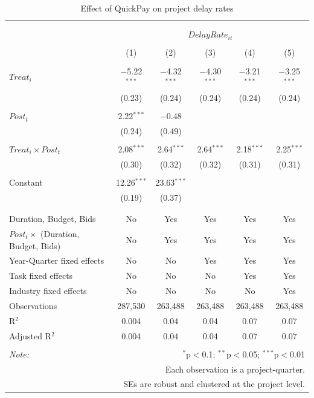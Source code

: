 \documentclass[
]{article}
\begin{document}
\begin{table}[H] \centering 
  \caption{Effect of QuickPay on project delay rates} 
  \label{} 
\small 
\begin{tabular}{@{\extracolsep{-2pt}}lccccc} 
\\[-1.8ex]\hline 
\hline \\[-1.8ex] 
\\[-1.8ex] & \multicolumn{5}{c}{$DelayRate_{it}$} \\ 
\\[-1.8ex] & (1) & (2) & (3) & (4) & (5)\\ 
\hline \\[-1.8ex] 
 $Treat_i$ & $-$5.22$^{***}$ & $-$4.32$^{***}$ & $-$4.30$^{***}$ & $-$3.21$^{***}$ & $-$3.25$^{***}$ \\ 
  & (0.23) & (0.24) & (0.24) & (0.24) & (0.24) \\ 
  & & & & & \\ 
 $Post_t$ & 2.22$^{***}$ & $-$0.48 &  &  &  \\ 
  & (0.24) & (0.49) &  &  &  \\ 
  & & & & & \\ 
 $Treat_i \times Post_t$ & 2.08$^{***}$ & 2.64$^{***}$ & 2.64$^{***}$ & 2.18$^{***}$ & 2.25$^{***}$ \\ 
  & (0.30) & (0.32) & (0.32) & (0.31) & (0.31) \\ 
  & & & & & \\ 
 Constant & 12.26$^{***}$ & 23.63$^{***}$ &  &  &  \\ 
  & (0.19) & (0.37) &  &  &  \\ 
  & & & & & \\ 
\hline \\[-1.8ex] 
Duration, Budget, Bids & No & Yes & Yes & Yes & Yes \\ 
$Post_t \times$  (Duration, Budget, Bids) & No & Yes & Yes & Yes & Yes \\ 
Year-Quarter fixed effects & No & No & Yes & Yes & Yes \\ 
Task fixed effects & No & No & No & Yes & Yes \\ 
Industry fixed effects & No & No & No & No & Yes \\ 
Observations & 287,530 & 263,488 & 263,488 & 263,488 & 263,488 \\ 
R$^{2}$ & 0.004 & 0.04 & 0.04 & 0.07 & 0.07 \\ 
Adjusted R$^{2}$ & 0.004 & 0.04 & 0.04 & 0.07 & 0.07 \\ 
\hline 
\hline \\[-1.8ex] 
\textit{Note:}  & \multicolumn{5}{r}{$^{*}$p$<$0.1; $^{**}$p$<$0.05; $^{***}$p$<$0.01} \\ 
 & \multicolumn{5}{r}{Each observation is a project-quarter.} \\ 
 & \multicolumn{5}{r}{SEs are robust and clustered at the project level.} \\ 
\end{tabular} 
\end{table}
\end{document}
